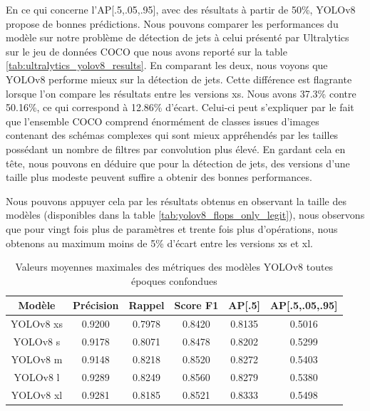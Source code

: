 En ce qui concerne l'AP[.5,.05,.95], avec des résultats à partir de 50\%, YOLOv8 propose de bonnes prédictions. Nous pouvons comparer les performances du modèle sur notre problème de détection de jets à celui présenté par Ultralytics sur le jeu de données COCO \cite{ultralytics_detect_nodate} que nous avons reporté sur la table \ref{tab:ultralytics_yolov8_results}. En comparant les deux, nous voyons que YOLOv8 performe mieux sur la détection de jets. Cette différence est flagrante lorsque l'on compare les résultats entre les versions xs. Nous avons 37.3\% contre 50.16\%, ce qui correspond à 12.86\% d'écart. Celui-ci peut s'expliquer par le fait que l'ensemble COCO comprend énormément de classes issues d'images contenant des schémas complexes qui sont mieux appréhendés par les tailles possédant un nombre de filtres par convolution plus élevé. En gardant cela en tête, nous pouvons en déduire que pour la détection de jets, des versions d'une taille plus modeste peuvent suffire a obtenir des bonnes performances.

Nous pouvons appuyer cela par les résultats obtenus en observant la taille des modèles (disponibles dans la table \ref{tab:yolov8_flops_only_legit}), nous observons que pour vingt fois plus de paramètres et trente fois plus d'opérations, nous obtenons au maximum moins de 5\% d'écart entre les versions xs et xl.

\begin{table}[!ht]
    \caption{Valeurs moyennes maximales des métriques des modèles YOLOv8 toutes époques confondues}
    \label{tab:max_values_for_each_metric_yolov8_models}
    \centering
    \begin{tabular}{ |c||c|c|c|c|c|  }
        \hline
        \rowcolor{gray!50}
        Modèle & Précision & Rappel & Score F1 & AP[.5] & AP[.5,.05,.95]\\
        \hline
        YOLOv8 xs & 0.9200 & 0.7978 & 0.8420 & 0.8135 & 0.5016\\
        YOLOv8 s & 0.9178 & 0.8071 & 0.8478 & 0.8202 & 0.5299\\
        YOLOv8 m & 0.9148 & 0.8218 & 0.8520 & 0.8272 & 0.5403\\
        YOLOv8 l & 0.9289 & 0.8249 & 0.8560 & 0.8279 & 0.5380\\
        YOLOv8 xl & 0.9281 & 0.8185 & 0.8521 & 0.8333 & 0.5498\\
        \hline
    \end{tabular}
\end{table}

